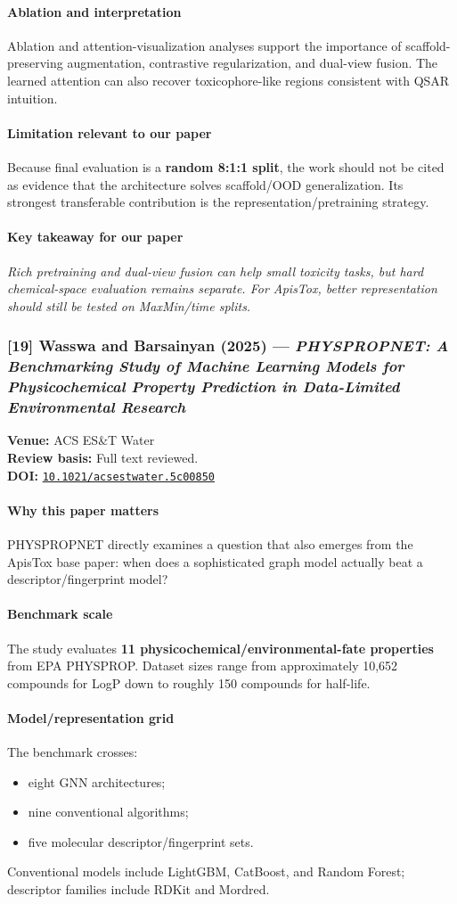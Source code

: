 \documentclass[11pt]{article}
\newcommand{\reviewfield}[2]{\paragraph{#1}#2}
\newcommand{\keytakeaway}[1]{\paragraph{Key takeaway for our paper}\emph{#1}}
\newcommand{\paperdoi}[1]{\href{https://doi.org/#1}{\texttt{#1}}}
\begin{document}
\reviewfield{Ablation and interpretation}{
Ablation and attention-visualization analyses support the importance of scaffold-preserving augmentation, contrastive regularization, and dual-view fusion. The learned attention can also recover toxicophore-like regions consistent with QSAR intuition.
}

\reviewfield{Limitation relevant to our paper}{
Because final evaluation is a \textbf{random 8:1:1 split}, the work should not be cited as evidence that the architecture solves scaffold/OOD generalization. Its strongest transferable contribution is the representation/pretraining strategy.
}

\keytakeaway{Rich pretraining and dual-view fusion can help small toxicity tasks, but hard chemical-space evaluation remains separate. For ApisTox, better representation should still be tested on MaxMin/time splits.}

\subsubsection{[19] Wasswa and Barsainyan (2025) --- \textit{PHYSPROPNET: A Benchmarking Study of Machine Learning Models for Physicochemical Property Prediction in Data-Limited Environmental Research}}
\textbf{Venue:} ACS ES\&T Water\\
\textbf{Review basis:} Full text reviewed.\\
\textbf{DOI:} \paperdoi{10.1021/acsestwater.5c00850}

\reviewfield{Why this paper matters}{
PHYSPROPNET directly examines a question that also emerges from the ApisTox base paper: when does a sophisticated graph model actually beat a descriptor/fingerprint model?
}

\reviewfield{Benchmark scale}{
The study evaluates \textbf{11 physicochemical/environmental-fate properties} from EPA PHYSPROP. Dataset sizes range from approximately 10,652 compounds for LogP down to roughly 150 compounds for half-life.
}

\reviewfield{Model/representation grid}{
The benchmark crosses:
\begin{itemize}
    \item eight GNN architectures;
    \item nine conventional algorithms;
    \item five molecular descriptor/fingerprint sets.
\end{itemize}
Conventional models include LightGBM, CatBoost, and Random Forest; descriptor families include RDKit and Mordred.
}
\end{document}
